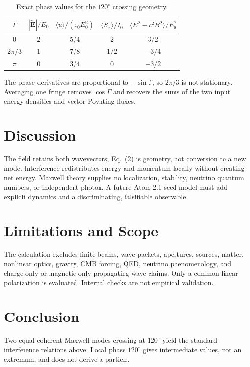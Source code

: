 \documentclass[11pt]{article}
\begin{document}
\begin{table}[h]
\centering
\caption{Exact phase values for the $120^\circ$ crossing geometry.}
\begin{tabular}{ccccc}
\toprule
$\Gamma$ & $|\widetilde{\mathbf E}|/E_0$ &
$\langle u\rangle/(\varepsilon_0E_0^2)$ & $\langle S_x\rangle/I_0$ &
$\langle E^2-c^2B^2\rangle/E_0^2$\\
\midrule
$0$ & $2$ & $5/4$ & $2$ & $3/2$\\
$2\pi/3$ & $1$ & $7/8$ & $1/2$ & $-3/4$\\
$\pi$ & $0$ & $3/4$ & $0$ & $-3/2$\\
\bottomrule
\end{tabular}
\end{table}

The phase derivatives are proportional to $-\sin\Gamma$, so $2\pi/3$ is not
stationary. Averaging one fringe removes $\cos\Gamma$ and recovers the sums of the
two input energy densities and vector Poynting fluxes.

\section{Discussion}
The field retains both wavevectors; Eq.~(2) is geometry, not conversion to a new
mode. Interference redistributes energy and momentum locally without creating net
energy. Maxwell theory supplies no localization, stability, neutrino quantum
numbers, or independent photon. A future Atom 2.1 seed model must add explicit
dynamics and a discriminating, falsifiable observable.

\section{Limitations and Scope}
The calculation excludes finite beams, wave packets, apertures, sources, matter,
nonlinear optics, gravity, CMB forcing, QED, neutrino phenomenology, and charge-only
or magnetic-only propagating-wave claims. Only a common linear polarization is
evaluated. Internal checks are not empirical validation.

\section{Conclusion}
Two equal coherent Maxwell modes crossing at $120^\circ$ yield the standard
interference relations above. Local phase $120^\circ$ gives intermediate values,
not an extremum, and does not derive a particle.
\end{document}
